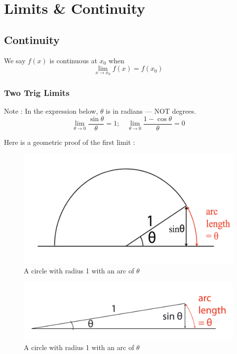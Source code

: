

\chapter{Limits \& Continuity}

\bigbreak
\section{Continuity}

We say $f(x)$ is continuous at $x_0$ when $$\lim_{x \to x_0} f(x) = f(x_0)$$

\subsection*{Two Trig Limits}

Note : In the expression below, $\theta$ is in radians --- NOT degrees.
$$ \boxed{	\lim_{\theta \to 0} \frac{\sin \theta}{\theta} = 1; \quad \lim_{\theta \to 0} \frac{1-\cos \theta}{\theta} = 0 } $$

Here is a geometric proof of the first limit : 

\begin{figure}[ht!]
	\centering
	\includegraphics[scale=0.7]{./images/lecture_2_figure_1.png}
	\caption{A circle with radius 1 with an arc of $\theta$}    
\end{figure}

\begin{figure}[ht!]
	\centering
	\includegraphics[scale=0.5]{./images/lecture_2_figure_2.png}
	\caption{A circle with radius 1 with an arc of $\theta$}    
\end{figure}

